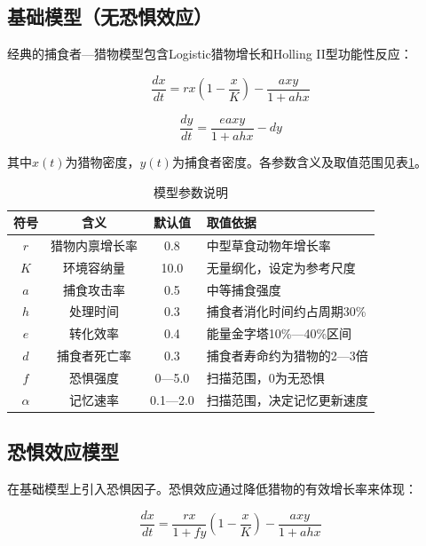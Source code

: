 \documentclass[UTF8]{ctexart}
\begin{document}
\subsection{基础模型（无恐惧效应）}

经典的捕食者—猎物模型包含Logistic猎物增长和Holling II型功能性反应：

\begin{equation}\label{eq:base_x}
    \frac{dx}{dt} = r x \left(1 - \frac{x}{K}\right) - \frac{a x y}{1 + a h x}
\end{equation}

\begin{equation}\label{eq:base_y}
    \frac{dy}{dt} = \frac{e a x y}{1 + a h x} - d y
\end{equation}

其中$x(t)$为猎物密度，$y(t)$为捕食者密度。各参数含义及取值范围见表\ref{tab:params}。

\begin{table}[H]
\centering
\caption{模型参数说明}
\label{tab:params}
\begin{tabular}{c|c|c|l}
\hline
\textbf{符号} & \textbf{含义} & \textbf{默认值} & \textbf{取值依据} \\
\hline
$r$ & 猎物内禀增长率 & 0.8 & 中型草食动物年增长率 \\
$K$ & 环境容纳量 & 10.0 & 无量纲化，设定为参考尺度 \\
$a$ & 捕食攻击率 & 0.5 & 中等捕食强度 \\
$h$ & 处理时间 & 0.3 & 捕食者消化时间约占周期30\% \\
$e$ & 转化效率 & 0.4 & 能量金字塔10\%—40\%区间 \\
$d$ & 捕食者死亡率 & 0.3 & 捕食者寿命约为猎物的2—3倍 \\
$f$ & 恐惧强度 & 0—5.0 & 扫描范围，0为无恐惧 \\
$\alpha$ & 记忆速率 & 0.1—2.0 & 扫描范围，决定记忆更新速度 \\
\hline
\end{tabular}
\end{table}

\subsection{恐惧效应模型}

在基础模型上引入恐惧因子。恐惧效应通过降低猎物的有效增长率来体现：

\begin{equation}\label{eq:fear_x}
    \frac{dx}{dt} = \frac{r x}{1 + f y} \left(1 - \frac{x}{K}\right) - \frac{a x y}{1 + a h x}
\end{equation}
\end{document}
